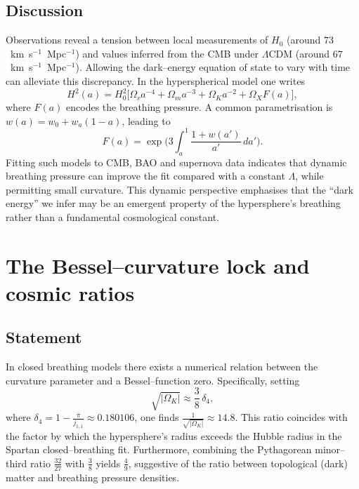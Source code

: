 \documentclass[12pt,a4paper]{article}
\begin{document}
\subsection{Discussion}
Observations reveal a tension between local measurements of $H_0$ (around $73$~km~s$^{-1}$~Mpc$^{-1}$) and values inferred from the CMB under $\Lambda$CDM (around $67$~km~s$^{-1}$~Mpc$^{-1}$).  Allowing the dark–energy equation of state to vary with time can alleviate this discrepancy.  In the hyperspherical model one writes
\[
H^2(a) = H_0^2 \Big[\Omega_r a^{-4} + \Omega_m a^{-3} + \Omega_K a^{-2} + \Omega_X F(a) \Big],
\]
where $F(a)$ encodes the breathing pressure.  A common parametrisation is $w(a)=w_0+w_a(1-a)$, leading to
\[
F(a)=\exp\Big( 3 \int_a^1 \! \frac{1+w(a')}{a'}\,da'\Big).
\]
Fitting such models to CMB, BAO and supernova data indicates that dynamic breathing pressure can improve the fit compared with a constant $\Lambda$, while permitting small curvature.  This dynamic perspective emphasises that the ``dark energy'' we infer may be an emergent property of the hypersphere’s breathing rather than a fundamental cosmological constant.

\section{The Bessel–curvature lock and cosmic ratios}
\label{sec:bessel}
\subsection{Statement}
In closed breathing models there exists a numerical relation between the curvature parameter and a Bessel–function zero.  Specifically, setting
\[
\sqrt{|\Omega_K|} \approx \frac{3}{8}\,\delta_4,
\]
where $\delta_4 = 1 - \frac{\pi}{j_{1,1}} \approx 0.180106$, one finds $\frac{1}{\sqrt{|\Omega_K|}} \approx 14.8$.  This ratio coincides with the factor by which the hypersphere’s radius exceeds the Hubble radius in the Spartan closed–breathing fit.  Furthermore, combining the Pythagorean minor–third ratio $\frac{32}{27}$ with $\frac{3}{8}$ yields $\frac{4}{9}$, suggestive of the ratio between topological (dark) matter and breathing pressure densities.
\end{document}
